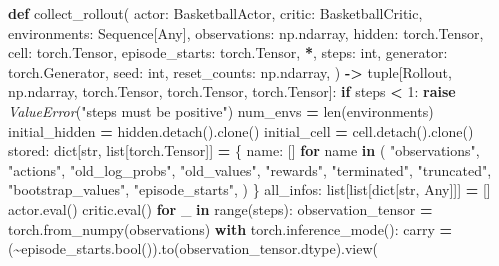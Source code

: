 \documentclass[
  chinese,
  11pt,
  letterpaper,
]{article}
\newenvironment{Shaded}{\begin{snugshade}}{\end{snugshade}}
\newcommand{\BuiltInTok}[1]{#1}
\newcommand{\ControlFlowTok}[1]{\textcolor[rgb]{0.13,0.29,0.53}{\textbf{#1}}}
\newcommand{\DecValTok}[1]{\textcolor[rgb]{0.00,0.00,0.81}{#1}}
\newcommand{\KeywordTok}[1]{\textcolor[rgb]{0.13,0.29,0.53}{\textbf{#1}}}
\newcommand{\NormalTok}[1]{#1}
\newcommand{\OperatorTok}[1]{\textcolor[rgb]{0.81,0.36,0.00}{\textbf{#1}}}
\newcommand{\PreprocessorTok}[1]{\textcolor[rgb]{0.56,0.35,0.01}{\textit{#1}}}
\newcommand{\StringTok}[1]{\textcolor[rgb]{0.31,0.60,0.02}{#1}}
\renewenvironment{Shaded}{\par\smallskip}{\par\smallskip}
\begin{document}
\begin{Shaded}
\begin{Highlighting}[]
\KeywordTok{def}\NormalTok{ collect\_rollout(}
\NormalTok{    actor: BasketballActor,}
\NormalTok{    critic: BasketballCritic,}
\NormalTok{    environments: Sequence[Any],}
\NormalTok{    observations: np.ndarray,}
\NormalTok{    hidden: torch.Tensor,}
\NormalTok{    cell: torch.Tensor,}
\NormalTok{    episode\_starts: torch.Tensor,}
    \OperatorTok{*}\NormalTok{,}
\NormalTok{    steps: }\BuiltInTok{int}\NormalTok{,}
\NormalTok{    generator: torch.Generator,}
\NormalTok{    seed: }\BuiltInTok{int}\NormalTok{,}
\NormalTok{    reset\_counts: np.ndarray,}
\NormalTok{) }\OperatorTok{{-}\textgreater{}} \BuiltInTok{tuple}\NormalTok{[Rollout, np.ndarray, torch.Tensor, torch.Tensor, torch.Tensor]:}
    \ControlFlowTok{if}\NormalTok{ steps }\OperatorTok{\textless{}} \DecValTok{1}\NormalTok{:}
        \ControlFlowTok{raise} \PreprocessorTok{ValueError}\NormalTok{(}\StringTok{"steps must be positive"}\NormalTok{)}
\NormalTok{    num\_envs }\OperatorTok{=} \BuiltInTok{len}\NormalTok{(environments)}
\NormalTok{    initial\_hidden }\OperatorTok{=}\NormalTok{ hidden.detach().clone()}
\NormalTok{    initial\_cell }\OperatorTok{=}\NormalTok{ cell.detach().clone()}
\NormalTok{    stored: }\BuiltInTok{dict}\NormalTok{[}\BuiltInTok{str}\NormalTok{, }\BuiltInTok{list}\NormalTok{[torch.Tensor]] }\OperatorTok{=}\NormalTok{ \{}
\NormalTok{        name: []}
        \ControlFlowTok{for}\NormalTok{ name }\KeywordTok{in}\NormalTok{ (}
            \StringTok{"observations"}\NormalTok{,}
            \StringTok{"actions"}\NormalTok{,}
            \StringTok{"old\_log\_probs"}\NormalTok{,}
            \StringTok{"old\_values"}\NormalTok{,}
            \StringTok{"rewards"}\NormalTok{,}
            \StringTok{"terminated"}\NormalTok{,}
            \StringTok{"truncated"}\NormalTok{,}
            \StringTok{"bootstrap\_values"}\NormalTok{,}
            \StringTok{"episode\_starts"}\NormalTok{,}
\NormalTok{        )}
\NormalTok{    \}}
\NormalTok{    all\_infos: }\BuiltInTok{list}\NormalTok{[}\BuiltInTok{list}\NormalTok{[}\BuiltInTok{dict}\NormalTok{[}\BuiltInTok{str}\NormalTok{, Any]]] }\OperatorTok{=}\NormalTok{ []}
\NormalTok{    actor.}\BuiltInTok{eval}\NormalTok{()}
\NormalTok{    critic.}\BuiltInTok{eval}\NormalTok{()}
    \ControlFlowTok{for}\NormalTok{ \_ }\KeywordTok{in} \BuiltInTok{range}\NormalTok{(steps):}
\NormalTok{        observation\_tensor }\OperatorTok{=}\NormalTok{ torch.from\_numpy(observations)}
        \ControlFlowTok{with}\NormalTok{ torch.inference\_mode():}
\NormalTok{            carry }\OperatorTok{=}\NormalTok{ (}\OperatorTok{\textasciitilde{}}\NormalTok{episode\_starts.}\BuiltInTok{bool}\NormalTok{()).to(observation\_tensor.dtype).view(}

\end{Highlighting}
\end{Shaded}
\end{document}
